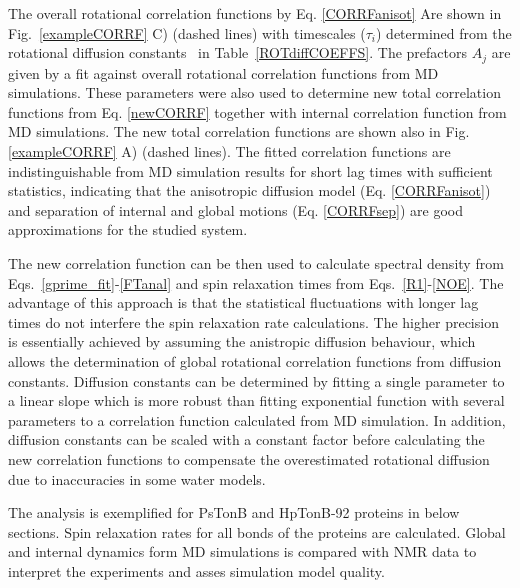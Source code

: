 \documentclass[pre,aps,floatfix,authordate1-4,twocolumn]{revtex4-1}
\begin{document}
The overall rotational correlation functions by Eq. \ref{CORRFanisot}
Are shown in Fig.~\ref{exampleCORRF} C) (dashed lines) with timescales ($\tau_i$)
determined from the rotational diffusion constants~\cite{Note1} in Table~\ref{ROTdiffCOEFFS}.
The prefactors $A_j$ are given by a fit against overall rotational correlation functions from MD simulations.
These parameters were also used to determine new total correlation functions from Eq. \ref{newCORRF} 
together with internal correlation function from MD simulations.
The new total correlation functions are shown also in Fig. \ref{exampleCORRF} A) (dashed lines).
The fitted correlation functions are indistinguishable from MD simulation results
for short lag times with sufficient statistics,
indicating that the anisotropic diffusion model (Eq. \ref{CORRFanisot}) and
separation of internal and global motions (Eq. \ref{CORRFsep}) are
good approximations for the studied system.

The new correlation function can be then used to calculate spectral
density from Eqs.~\ref{gprime_fit}-\ref{FTanal} and spin relaxation
times from Eqs.~\ref{R1}-\ref{NOE}.
The advantage of this approach is that the statistical fluctuations
with longer lag times do not interfere the spin relaxation rate calculations.
The higher precision is essentially achieved by assuming the anistropic
diffusion behaviour, which allows the determination of global rotational
correlation functions from diffusion constants. Diffusion constants
can be determined by fitting a single parameter to a linear slope which is
more robust than fitting exponential function with several parameters to
a correlation function calculated from MD simulation.
In addition, diffusion constants can be scaled with a constant
factor before calculating the new correlation functions to compensate
the overestimated rotational diffusion due to inaccuracies in some
water models.

The analysis is exemplified for PsTonB and HpTonB-92 proteins in below sections.
Spin relaxation rates for all bonds of the proteins are calculated.
Global and internal dynamics form MD simulations is compared with
NMR data to interpret the experiments and asses simulation model quality.
\end{document}
